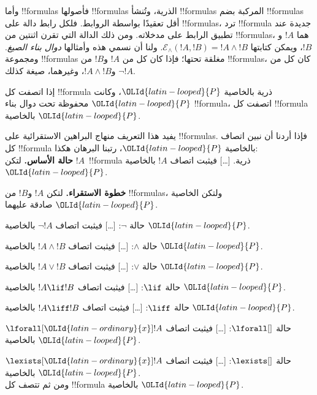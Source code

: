 \documentclass[../../../include/open-logic-section]{subfiles}
\begin{document}
\begin{explain}
وأما !!{formula}s فأصولها !!{formula}s الذرية، وتُنشأ !!{formula}s المركبة
بضم !!{formula}s أقل تعقيدًا بواسطة الروابط. فلكل رابط دالة على
!!{formula}s، ترد !!{formula} جديدة عند تطبيق الرابط على مدخلاته. ومن
ذلك الدالة التي تقرن اثنتين من !!{formula}s، هما $!A$ و$!B$، ويمكن كتابتها
$\mathcal E _\land (!A, !B) = !A \land !B$. ولنا أن نسمي هذه وأمثالها
\emph{دوال بناء الصيغ}. ومجموعة !!{formula}s مغلقة تحتها؛ فإذا كان كل من
$!A$ و$!B$ من !!{formula}s، كان كل من $\lnot !A$ و$!A \land !B$،
وغيرهما، صيغة كذلك.
\end{explain}

\begin{defn}
إذا اتصفت كل !!{formula} ذرية بالخاصية ${\OLId{latin-looped}{P}}$، وكانت ${\OLId{latin-looped}{P}}$ محفوظة تحت دوال
بناء !!{formula}، اتصفت كل !!{formula} بالخاصية ${\OLId{latin-looped}{P}}$.
\end{defn}

\begin{explain}
يفيد هذا التعريف منهاج البراهين الاستقرائية على !!{formula}s. فإذا أردنا
أن نبين اتصاف كل !!{formula} بالخاصية ${\OLId{latin-looped}{P}}$، رتبنا البرهان هكذا:\\

\textbf{حالة الأساس.} لتكن $!A$~!!{formula} ذرية. [\ldots]
فيثبت اتصاف $!A$ بالخاصية ${\OLId{latin-looped}{P}}$.

\textbf{خطوة الاستقراء.} لتكن $!A$ و$!B$ من !!{formula}s، ولتكن
الخاصية ${\OLId{latin-looped}{P}}$ صادقة عليهما.

حالة $\lnot$: [\ldots] فيثبت اتصاف $\lnot !A$ بالخاصية ${\OLId{latin-looped}{P}}$.

حالة $\land$: [\ldots] فيثبت اتصاف $!A \land !B$ بالخاصية ${\OLId{latin-looped}{P}}$.

حالة $\lor$: [\ldots] فيثبت اتصاف $!A \lor !B$ بالخاصية ${\OLId{latin-looped}{P}}$.

حالة $\lif$: [\ldots] فيثبت اتصاف $!A \lif !B$ بالخاصية ${\OLId{latin-looped}{P}}$.

حالة $\liff$: [\ldots] فيثبت اتصاف $!A \liff !B$ بالخاصية ${\OLId{latin-looped}{P}}$.

حالة $\lforall[]$: [\ldots] فيثبت اتصاف $\lforall[{\OLId{latin-ordinary}{x}}] !A$ بالخاصية ${\OLId{latin-looped}{P}}$.

حالة $\lexists[]$: [\ldots] فيثبت اتصاف $\lexists[{\OLId{latin-ordinary}{x}}] !A$ بالخاصية ${\OLId{latin-looped}{P}}$. \\

ومن ثم تتصف كل !!{formula} بالخاصية ${\OLId{latin-looped}{P}}$.
\end{explain}
\end{document}
